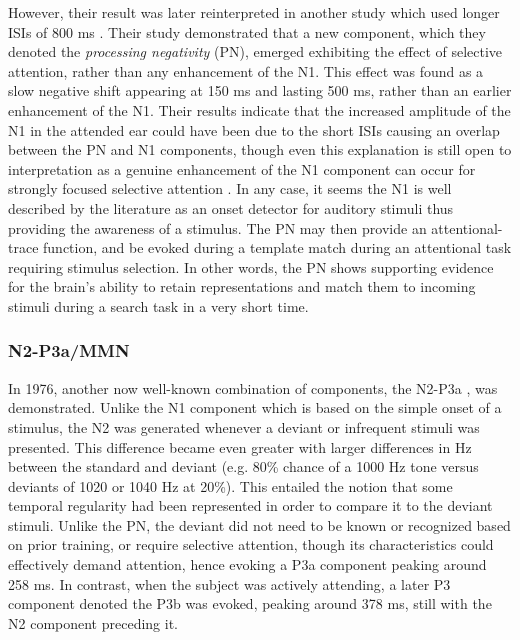 However, their result was later reinterpreted in another study which used longer ISIs of 800 ms \cite{Naatanen1978}.  Their study demonstrated that a new component, which they denoted the \textit{processing negativity} (PN), emerged exhibiting the effect of selective attention, rather than any enhancement of the N1.  This effect was found as a slow negative shift appearing at 150 ms and lasting 500 ms, rather than an earlier enhancement of the N1.  Their results indicate that the increased amplitude of the N1 in the attended ear could have been due to the short ISIs causing an overlap between the PN and N1 components, though even this explanation is still open to interpretation as a genuine enhancement of the N1 component can occur for strongly focused selective attention \cite{Naatanen1978,Hillyard1983,Naatanen2011}.  In any case, it seems the N1 is well described by the literature as an onset detector for auditory stimuli thus providing the awareness of a stimulus.  The PN may then provide an attentional-trace function, and be evoked during a template match during an attentional task requiring stimulus selection.  In other words, the PN shows supporting evidence for the brain's ability to retain representations and match them to incoming stimuli during a search task in a very short time.

\subsubsection{N2-P3a/MMN}

In 1976, another now well-known combination of components, the N2-P3a \cite{Snyder1976}, was demonstrated.  Unlike the N1 component which is based on the simple onset of a stimulus, the N2 was generated whenever a deviant or infrequent stimuli was presented.  This difference became even greater with larger differences in Hz between the standard and deviant (e.g. 80\% chance of a 1000 Hz tone versus deviants of 1020 or 1040 Hz at 20\%).  This entailed the notion that some temporal regularity had been represented in order to compare it to the deviant stimuli.  Unlike the PN, the deviant did not need to be known or recognized based on prior training, or require selective attention, though its characteristics could effectively demand attention, hence evoking a P3a component peaking around 258 ms.  In contrast, when the subject was actively attending, a later P3 component denoted the P3b was evoked, peaking around 378 ms, still with the N2 component preceding it. 

